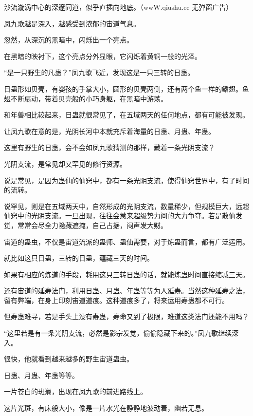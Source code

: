 
\begin{this_body}

沙流漩涡中心的深邃同道，似乎直插向地底。（wwW.qiushu.cc 无弹窗广告）

凤九歌越是深入，越感受到浓郁的宙道气息。

忽然，从深沉的黑暗中，闪烁出一个亮点。

在黑暗的映衬下，这个亮点分外显眼，它闪烁着黄铜一般的光泽。

“是一只野生的凡蛊？”凤九歌飞近，发现这是一只三转的日蛊。

日蛊形如贝壳，有婴孩的手掌大小，圆形的贝壳两侧，还有两个鱼一样的鳍翅。鱼翅不断扇动，带着贝壳般的小巧身躯，在黑暗中游荡。

和年兽相比较起来，日蛊就很常见了，在五域两天的任何地点，都有可能被发现。

让凤九歌在意的是，光阴长河中本就充斥着海量的日蛊、月蛊、年蛊。

这里有野生的日蛊，会不会如凤九歌猜测的那样，藏着一条光阴支流？

光阴支流，是常见却又罕见的修行资源。

说是常见，是因为蛊仙的仙窍中，都有一条光阴支流，使得仙窍世界中，有了时间的流转。

说罕见，则是在五域两天中，自然形成的光阴支流，数量稀少，但规模巨大，远超仙窍中的光阴支流。一旦出现，往往会惹来超级势力间的大力争夺。若是散仙发觉，常常会尽全力隐藏遮掩，自己占据，闷声发大财。

宙道的蛊虫，不仅是宙道流派的蛊师、蛊仙需要，对于炼蛊而言，都有广泛运用。

就比如这只日蛊，三转的日蛊，蕴藏三天的时间。

如果有相应的炼道的手段，耗用这只三转日蛊的话，就能炼蛊时间直接缩减三天。

还有宙道的延寿法门，利用日蛊、月蛊、年蛊等等为人延寿。当然这种延寿之法，留有弊端，在身上印刻宙道道痕。这种道痕多了，将来运用寿蛊都不可行。

但寿蛊难寻，若是手头上没有寿蛊，寿命又到了极限，难道这类法门还能不用吗？

“这里若是有一条光阴支流，必然是影宗发觉，偷偷隐藏下来的。”凤九歌继续深入。

很快，他就看到越来越多的野生宙道蛊虫。

日蛊、月蛊、年蛊等等。

一片苍白的斑斓，出现在凤九歌的前进路线上。

这片光斑，有床般大小，像是一片水光在静静地波动着，幽若无息。


\end{this_body}
